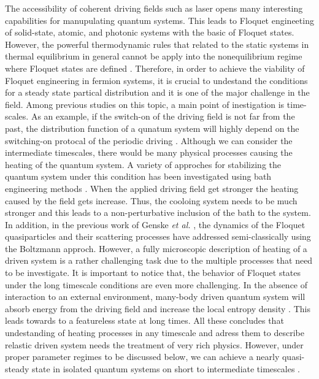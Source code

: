 \documentclass{article}
\begin{document}
The accessibility of coherent driving fields such as laser opens many interesting capabilities for manupulating quantum systems. This leads to Floquet engineeting of solid-state, atomic, and photonic systems with the basic of Floquet states. However, the powerful thermodynamic rules that related to the static systems in thermal equilibrium in general cannot be apply into the nonequilibrium regime where Floquet states are defined \cite{seetharam2015}. Therefore, in order to achieve the viability of Floquet engineering in fermion systems, it is crucial to undestand the conditions for a steady state partical distribution and it is one of the major challenge in the field. Among previous studies on this topic, a main point of inestigation is time-scales. As an example, if the switch-on of the driving field is not far from the past, the distribution function of a qunatum system will highly depend on the switching-on protocal of the periodic driving \cite{dehghani2014}. Although we can consider the intermediate timescales, there would be many physical processes causing the heating of the quantum system. A variety of approches for stabilizing the quantum system under this condition has been investigated using bath engineering methods \cite{seetharam2015,weidinger2017,seetharam2019,rudner2020}. When the applied driving field get stronger the heating caused by the field gets increase. Thus, the cooloing system needs to be much stronger and this leads to a non-perturbative inclusion of the bath to the system. In addition, in the previous work of Genske \textit{et al.} \cite{genske2015}, the dynamics of the Floquet quasiparticles and their scattering processes have addressed semi-classically using the Boltzmann approch. However, a fully microscopic description of heating of a driven system is a rather challenging task due to the multiple processes that need to be investigate.
It is important to notice that, the behavior of Floquet states under the long timescale conditions are even more challenging. In the absence of interaction to an external environment, many-body driven quantum system will absorb energy from the driving field and increase the local entropy density \cite{rudner2020}. This leads towards to a featureless state at long times. All these concludes that undestanding of heating processes in any timescale and adress them to describe relastic driven system needs the treatment of very rich physics. However, under proper parameter regimes to be discussed below, we can achieve a nearly quasi-steady state in isolated quantum systems on short to intermediate timescales \cite{lindner2017,bukov2015,eckardt2015,kuwahara2016,abanin2017,mori2018,rudner2020}.
\end{document}
